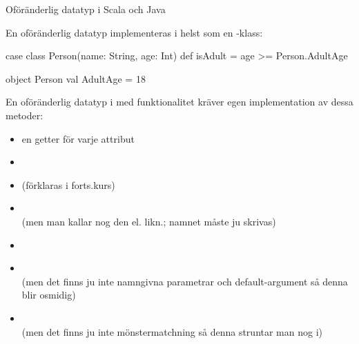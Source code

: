 \begin{Slide}{Oföränderlig datatyp i Scala och Java}
\ifkompendium\else
\SlideFontTiny\vspace{-0.5em}\begin{multicols}{2}
\fi 

En oföränderlig datatyp implementeras i  helst som en \pause{}-klass:

\begin{CodeSmall}[basicstyle=\ttfamily\SlideFontSize{5.7}{6.7}]
case class Person(name: String, age: Int) {
  def isAdult = age >= Person.AdultAge
}

object Person {
  val AdultAge = 18
}
\end{CodeSmall}

\pause
\ifkompendium\else\columnbreak\fi

\noindent En oföränderlig datatyp i  med  funktionalitet kräver egen implementation av dessa metoder:
\ifkompendium\else\vspace{-0.25em}\fi
\begin{itemize}
\item en getter för varje attribut
\item {}
\item {} (förklaras i forts.kurs)
\item {} \\ (men man kallar nog den  el. likn.; namnet måste ju skrivas)
\item {}
\item {} \\ (men det finns ju inte namngivna parametrar och default-argument så denna blir osmidig)
\item {} \\ (men det finns ju inte mönstermatchning så denna struntar man nog i)
\end{itemize}

\ifkompendium\else
\end{multicols}
\fi
\end{Slide}






